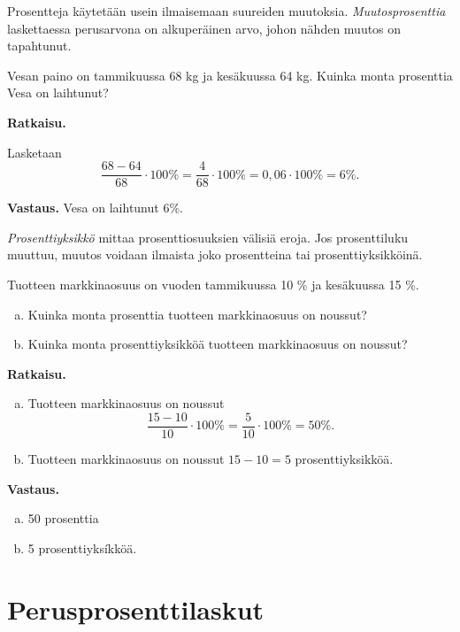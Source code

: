 Prosentteja käytetään usein ilmaisemaan suureiden muutoksia. \emph{Muutosprosenttia} laskettaessa perusarvona on alkuperäinen arvo, johon nähden muutos on tapahtunut.

\begin{esimerkki}
    Vesan paino on tammikuussa 68 kg ja kesäkuussa 64 kg. Kuinka monta prosenttia Vesa on laihtunut?

    {\bf Ratkaisu.}

    Lasketaan 
    \[
    \frac{68-64}{68}\cdot 100\% = \frac{4}{68} \cdot 100\%=0,06\cdot 100\% = 6\%.
    \]
    
    {\bf Vastaus.}
    Vesa on laihtunut $6\%$.
\end{esimerkki}


\emph{Prosenttiyksikkö} mittaa prosenttiosuuksien välisiä eroja. Jos prosenttiluku muuttuu, muutos voidaan ilmaista joko prosentteina tai prosenttiyksikköinä.


\begin{esimerkki}
    Tuotteen markkinaosuus on vuoden tammikuussa 10 \% ja kesäkuussa 15 \%. 
    \begin{enumerate}[a)]
    \item Kuinka monta prosenttia tuotteen markkinaosuus on noussut?
    
    \item Kuinka monta prosenttiyksikköä tuotteen markkinaosuus on noussut?
    \end{enumerate}
    
    {\bf Ratkaisu.} 
    
    \begin{enumerate}[a)]
    \item Tuotteen markkinaosuus on noussut
    \[
    \frac{15-10}{10} \cdot 100 \%= \frac{5}{10}\cdot 100\% = 50\%.
    \]
    
    \item Tuotteen markkinaosuus on noussut $15-10=5$ prosenttiyksikköä. 
    \end{enumerate}
    
    {\bf Vastaus.}
    
    \begin{enumerate}[a)]
    \item 50 prosenttia
    \item 5 prosenttiyksíkköä.
    \end{enumerate}
\end{esimerkki}




\section{Perusprosenttilaskut}

